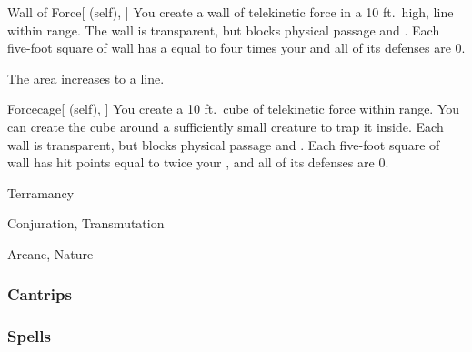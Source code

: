 \lowercase{\hypertarget{spell:Wall of Force}{}}\label{spell:Wall of Force}
\begin{attuneability}[Rank 5]{\hypertarget{spell:Wall of Force}{Wall of Force}}[ (self), ]
\targetrule
You create a wall of telekinetic force in a 10 ft.\ high, \arealarge line within \rngmed range.
The wall is transparent, but blocks physical passage and .
Each five-foot square of wall has a  equal to four times your  and all of its defenses are 0.

\rankline
{} The area increases to a \areahuge line.
\end{attuneability}
\vspace{0.25em}



\lowercase{\hypertarget{spell:Forcecage}{}}\label{spell:Forcecage}
\begin{attuneability}[Rank 8]{\hypertarget{spell:Forcecage}{Forcecage}}[ (self), ]
\targetrule
You create a 10 ft.\ cube of telekinetic force within \rngmed range.
You can create the cube around a sufficiently small creature to trap it inside.
Each wall is transparent, but blocks physical passage and .
Each five-foot square of wall has hit points equal to twice your , and all of its defenses are 0.
\end{attuneability}
\vspace{0.25em}


\newpage
\begin{spellsection}{Terramancy}

\begin{spellheader}
\end{spellheader}


 Conjuration, Transmutation

 Arcane, Nature

\subsubsection{Cantrips}


\end{spellsection}


\subsubsection{Spells}


